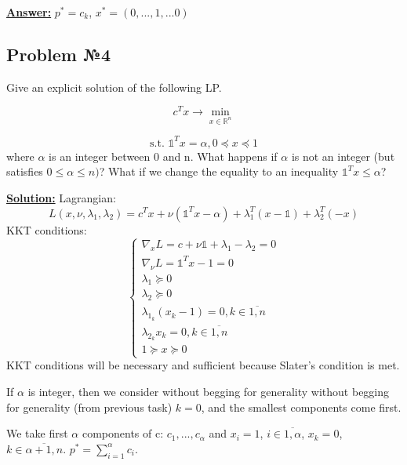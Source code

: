 \underline{\textbf{Answer:}} $p^* = c_k$, $x^* = (0, ..., 1, ...0)$ 

\subsection{Problem №4}
Give an explicit solution of the following LP.

\begin{equation*}
    c^T x  \xrightarrow{} \min\limits_{x \in \mathds{R}^n}
\end{equation*}

\begin{equation*}
   \text{s.t. } \mathds{1}^Tx = \alpha, 0 \preccurlyeq x \preccurlyeq 1
\end{equation*}
where $\alpha$ is an integer between 0 and n. What happens if $\alpha$ is not an integer (but satisfies $0 \leq  \alpha \leq n)$? What if we change the equality to an inequality $\mathds{1}^Tx \leq \alpha$?

\underline{\textbf{Solution:}}
Lagrangian:
\begin{equation*}
    L(x, \nu, \lambda_1, \lambda_2) = c^Tx + \nu(\mathds{1}^Tx - \alpha) + \lambda_1^T(x - \mathds{1}) + \lambda_2^T(-x)
\end{equation*}
KKT conditions:
\begin{equation*}
    \begin{cases}
    \nabla_x L = c + \nu \mathds{1} + \lambda_1 - \lambda_2 = 0 \\
    \nabla_{\nu} L = \mathds{1}^Tx - 1 =0   \\
    \lambda_1 \succeq 0 \\
    \lambda_2 \succeq 0 \\
    \lambda_{1_k} (x_k - 1) = 0, k \in \overline{1, n} \\
    \lambda_{2_k} x_k = 0, k \in \overline{1, n} \\
    1 \succeq x \succeq 0
    \end{cases}
\end{equation*}
KKT conditions will be necessary and sufficient because Slater's condition is met.

If $\alpha$ is integer, then we consider without begging for generality without begging for generality (from previous task) $k = 0$, and the smallest components come first. 

We take first $\alpha$ components of c: $c_1, ..., c_{\alpha}$ and $x_i = 1$, $i \in \overline{1, \alpha}$, $x_k = 0$, $k \in \overline{\alpha + 1, n}$. $p^* = \sum\limits_{i=1}^\alpha c_i$. 


